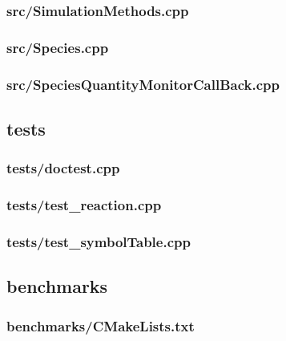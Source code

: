 \subsubsection{src/SimulationMethods.cpp}

\newpage
\subsubsection{src/Species.cpp}

\newpage
\subsubsection{src/SpeciesQuantityMonitorCallBack.cpp}

\newpage
\subsection{tests}
\subsubsection{tests/doctest.cpp}

\newpage
\subsubsection{tests/test\_reaction.cpp}

\newpage
\subsubsection{tests/test\_symbolTable.cpp}

\newpage
\subsection{benchmarks}
\subsubsection{benchmarks/CMakeLists.txt}

\newpage
